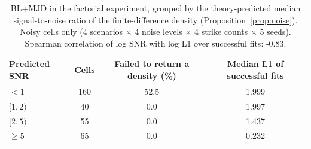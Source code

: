 \begin{table}[htbp]
\centering
\caption{BL+MJD in the factorial experiment, grouped by the theory-predicted median signal-to-noise ratio of the finite-difference density (Proposition~\ref{prop:noise}). Noisy cells only (4 scenarios $\times$ 4 noise levels $\times$ 4 strike counts $\times$ 5 seeds). Spearman correlation of log SNR with log L1 over successful fits: -0.83.}
\label{tab:snr}
\small
\begin{tabular}{lccc}
\toprule
Predicted SNR & Cells & Failed to return a density (\%) & Median L1 of successful fits \\
\midrule
$<1$ & 160 & 52.5 & 1.999 \\
$[1,2)$ & 40 & 0.0 & 1.997 \\
$[2,5)$ & 55 & 0.0 & 1.437 \\
$\ge 5$ & 65 & 0.0 & 0.232 \\
\bottomrule
\end{tabular}
\end{table}
